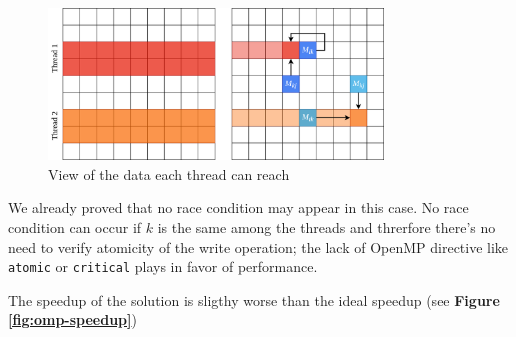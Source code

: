 \begin{figure}[h!]
\centering                                                                        
\includegraphics[width=3.5in]{diagrams/openmp-threads}
\captionsetup{justification=centering,margin=2cm}                                                                                                                                   
\caption{View of the data each thread can reach}                                                                                                                                            
\label{fig:threads}                                                                                                                                                           
\end{figure}


We already proved that no race condition may appear in this case. 
No race condition can occur if $k$ is the same among the threads and threrfore there's no need to verify atomicity of the write operation;
the lack of OpenMP directive like \texttt{atomic} or \texttt{critical} plays in favor of performance. \par

The speedup of the solution is sligthy worse than the ideal speedup (see \textbf{Figure \ref*{fig:omp-speedup}})

